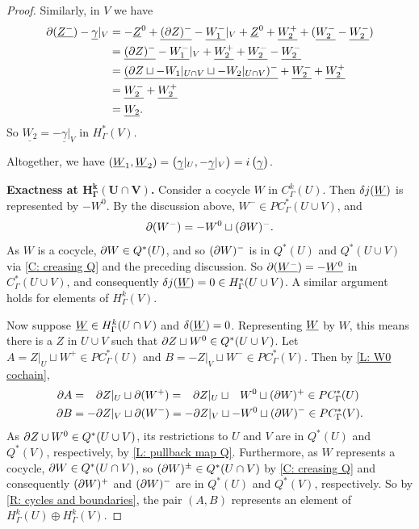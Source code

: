 \begin{proof}
	Similarly, in $V$ we have
	\begin{align*}
	\partial (\underline{Z^-}) - \underline{\gamma}|_V &
		= - \underline Z^0 + \underline{(\partial Z)^-} - \underline{W_1^-}|_V + \underline Z^0 +\underline{W_2^+} + (\underline{W_2^-} - \underline{W_2^-})\\
		&= \underline{(\partial Z)^-} - \underline{W_1^-}|_V + \underline{W_2^+} + \underline{W_2^-} - \underline{W_2^-}\\
		&= \underline{(\partial Z \sqcup - W_1|_{U \cap V} \sqcup - W_2|_{U \cap V})^-} + \underline{W_2^-} + \underline{W_2^+}\\
		&=\underline{W_2^-} + \underline{W_2^+}\\
		&=\underline{W_2}.
	\end{align*}
	So $\underline{W_2} = -\underline{\gamma}|_V$ in $H^*_\Gamma(V)$.


	Altogether, we have $(\underline{W}_1,\underline{W}_2) = \left(\underline{\gamma}|_U, -\underline{\gamma}|_V\right) = i\left(\underline{\gamma}\right)$.

	\textbf{Exactness at $\mathbf{H^k_\Gamma(U \cap V)}$.}
	Consider a cocycle $W$ in $C^k_\Gamma(U)$.
	Then $\delta j(\underline{W})$ is represented by $-W^0$.
	By the discussion above, $W^- \in PC^*_\Gamma(U \cup V)$, and $$\partial (W^-) = -W^0 \sqcup (\partial W)^-.$$ As $W$ is a cocycle, $\partial W \in Q^*(U)$, and so $(\partial W)^-$ is in $Q^*(U)$ and $Q^*(U \cup V)$ via \cref{C: creasing Q} and the preceding discussion.
	So $\partial (\underline{W^-}) = - \underline{W^0}$ in $C^*_\Gamma(U \cup V)$, and consequently
 $\delta j(\underline{W}) = 0 \in H^*_\Gamma(U \cup V)$.
	A similar argument holds for elements of $H^k_\Gamma(V)$.

	Now suppose $\underline{W} \in H^k_\Gamma(U \cap V)$ and $\delta(\underline{W}) = 0$.
	Representing $\underline{W}$ by $W$, this means there is a $Z$ in $U \cup V$ such that $\partial Z \sqcup W^0 \in Q^*(U \cup V)$.
	Let $A = Z|_U \sqcup W^+ \in PC^*_\Gamma(U)$ and $B = -Z|_V \sqcup W^- \in PC^*_\Gamma(V)$.
	Then by \cref{L: W0 cochain},
	\begin{align*}
		\partial A& = \phantom{-}\partial Z|_U \sqcup \partial( W^+) = \phantom{-}\partial Z|_U \sqcup \phantom{-} W^0 \sqcup (\partial W)^{+} \in PC^*_\Gamma(U)\\
		\partial B& = -\partial Z|_V \sqcup \partial (W^-) = -\partial Z|_V \sqcup -W^0 \sqcup (\partial W)^{-} \in PC^*_\Gamma(V).
	\end{align*}
	As $\partial Z \cup W^0 \in Q^*(U \cup V)$, its restrictions to $U$ and $V$ are in $Q^*(U)$ and $Q^*(V)$, respectively, by \cref{L: pullback map Q}.
	Furthermore, as $W$ represents a cocycle, $\partial W \in Q^*(U \cap V)$, so $(\partial W)^\pm \in Q^*(U\cap V)$ by \cref{C: creasing Q} and consequently $(\partial W)^+$ and $(\partial W)^-$ are in $Q^*(U)$ and $Q^*(V)$, respectively.
	So by \cref{R: cycles and boundaries}, the pair $(A,B)$ represents an element of $H^k_\Gamma(U) \oplus H^k_\Gamma(V)$.


\end{proof}
